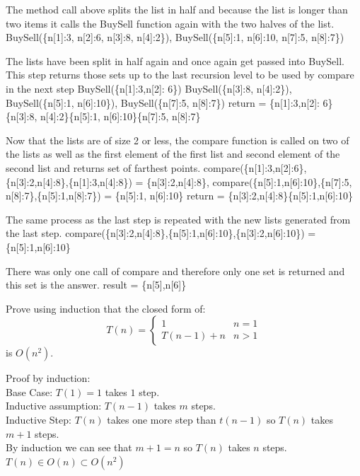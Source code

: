 \documentclass{article}
\begin{document}
The method call above splits the list in half and because the list is longer than two items it calls the BuySell function again with the two halves of the list.\newline
BuySell(\{n[1]:3, n[2]:6, n[3]:8, n[4]:2\}), BuySell(\{n[5]:1, n[6]:10, n[7]:5, n[8]:7\})\newline

The lists have been split in half again and once again get passed into BuySell. This step returns those sets up to the last recursion level to be used by compare in the next step\newline
BuySell(\{n[1]:3,n[2]: 6\}) BuySell(\{n[3]:8, n[4]:2\}), BuySell(\{n[5]:1, n[6]:10\}), BuySell(\{n[7]:5, n[8]:7\})\newline
return = \{n[1]:3,n[2]: 6\}\{n[3]:8, n[4]:2\}\{n[5]:1, n[6]:10\}\{n[7]:5, n[8]:7\}

Now that the lists are of size 2 or less, the compare function is called on two of the lists as well as the first element of the first list and second element of the second list and returns set of farthest points. \newline
compare(\{n[1]:3,n[2]:6\},\{n[3]:2,n[4]:8\},\{n[1]:3,n[4]:8\}) = \{n[3]:2,n[4]:8\}, compare(\{n[5]:1,n[6]:10\},\{n[7]:5, n[8]:7\},\{n[5]:1,n[8]:7\}) = \{n[5]:1, n[6]:10\}\newline
return = \{n[3]:2,n[4]:8\}\{n[5]:1,n[6]:10\}\newline

The same process as the last step is repeated with the new lists generated from the last step.\newline
compare(\{n[3]:2,n[4]:8\},\{n[5]:1,n[6]:10\},\{n[3]:2,n[6]:10\}) = \{n[5]:1,n[6]:10\}\newline

There was only one call of compare and therefore only one set is returned and this set is the answer.\newline
result = \{n[5],n[6]\}

\nextprob
Prove using induction that the closed form of:
$$T(n) = \begin{cases}
            1        & n=1\\
            T(n-1)+n & n>1
         \end{cases}
$$
is $O(n^2)$.

Proof by induction:\\
Base Case: $T(1) = 1$ takes $1$ step.\\
Inductive assumption: $T(n-1)$ takes $m$ steps.\\
Inductive Step: $T(n)$ takes one more step than $t(n-1)$ so $T(n)$ takes $m + 1$ steps.\\
By induction we can see that $m + 1 = n$ so $T(n)$ takes $n$ steps. $T(n) \in O(n) \subset O(n^2 )$
\end{document}
